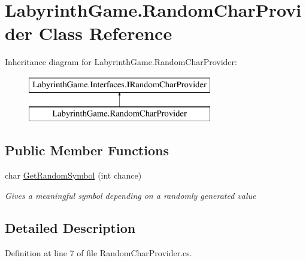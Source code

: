 \hypertarget{class_labyrinth_game_1_1_random_char_provider}{\section{Labyrinth\+Game.\+Random\+Char\+Provider Class Reference}
\label{class_labyrinth_game_1_1_random_char_provider}
}
Inheritance diagram for Labyrinth\+Game.\+Random\+Char\+Provider\+:\begin{figure}[H]
\begin{center}
\leavevmode
\includegraphics[height=2.000000cm]{class_labyrinth_game_1_1_random_char_provider}
\end{center}
\end{figure}
\subsection*{Public Member Functions}
\begin{DoxyCompactItemize}
\item 
char \hyperlink{class_labyrinth_game_1_1_random_char_provider_a02e6312f17179a4b4cd5dde9cd16ea45}{Get\+Random\+Symbol} (int chance)
\begin{DoxyCompactList}\small\item\em Gives a meaningful symbol depending on a randomly generated value \end{DoxyCompactList}\end{DoxyCompactItemize}


\subsection{Detailed Description}


Definition at line 7 of file Random\+Char\+Provider.\+cs.



